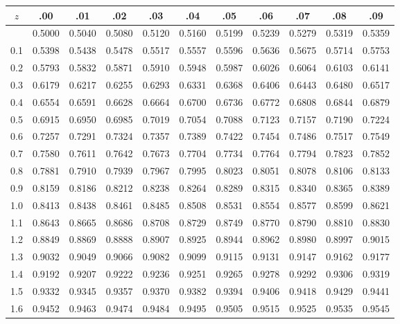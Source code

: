\documentclass[12pt,a4paper]{article}
\begin{document}
\begin{enumerate}
\begin{center}
\small
\begin{longtable}{ccccccccccc}
\toprule\toprule
$z$ & .00 & .01 & .02 & .03 & .04 & .05 & .06 & .07 & .08 & .09 \\
\midrule
\endhead
\bottomrule\bottomrule
\endfoot
0.0 & 0.5000 & 0.5040 & 0.5080 & 0.5120 & 0.5160 & 0.5199 & 0.5239 & 0.5279 & 0.5319 & 0.5359 \\
0.1 & 0.5398 & 0.5438 & 0.5478 & 0.5517 & 0.5557 & 0.5596 & 0.5636 & 0.5675 & 0.5714 & 0.5753 \\
0.2 & 0.5793 & 0.5832 & 0.5871 & 0.5910 & 0.5948 & 0.5987 & 0.6026 & 0.6064 & 0.6103 & 0.6141 \\
0.3 & 0.6179 & 0.6217 & 0.6255 & 0.6293 & 0.6331 & 0.6368 & 0.6406 & 0.6443 & 0.6480 & 0.6517 \\
0.4 & 0.6554 & 0.6591 & 0.6628 & 0.6664 & 0.6700 & 0.6736 & 0.6772 & 0.6808 & 0.6844 & 0.6879 \\
0.5 & 0.6915 & 0.6950 & 0.6985 & 0.7019 & 0.7054 & 0.7088 & 0.7123 & 0.7157 & 0.7190 & 0.7224 \\
0.6 & 0.7257 & 0.7291 & 0.7324 & 0.7357 & 0.7389 & 0.7422 & 0.7454 & 0.7486 & 0.7517 & 0.7549 \\
0.7 & 0.7580 & 0.7611 & 0.7642 & 0.7673 & 0.7704 & 0.7734 & 0.7764 & 0.7794 & 0.7823 & 0.7852 \\
0.8 & 0.7881 & 0.7910 & 0.7939 & 0.7967 & 0.7995 & 0.8023 & 0.8051 & 0.8078 & 0.8106 & 0.8133 \\
0.9 & 0.8159 & 0.8186 & 0.8212 & 0.8238 & 0.8264 & 0.8289 & 0.8315 & 0.8340 & 0.8365 & 0.8389 \\
1.0 & 0.8413 & 0.8438 & 0.8461 & 0.8485 & 0.8508 & 0.8531 & 0.8554 & 0.8577 & 0.8599 & 0.8621 \\
1.1 & 0.8643 & 0.8665 & 0.8686 & 0.8708 & 0.8729 & 0.8749 & 0.8770 & 0.8790 & 0.8810 & 0.8830 \\
1.2 & 0.8849 & 0.8869 & 0.8888 & 0.8907 & 0.8925 & 0.8944 & 0.8962 & 0.8980 & 0.8997 & 0.9015 \\
1.3 & 0.9032 & 0.9049 & 0.9066 & 0.9082 & 0.9099 & 0.9115 & 0.9131 & 0.9147 & 0.9162 & 0.9177 \\
1.4 & 0.9192 & 0.9207 & 0.9222 & 0.9236 & 0.9251 & 0.9265 & 0.9278 & 0.9292 & 0.9306 & 0.9319 \\
1.5 & 0.9332 & 0.9345 & 0.9357 & 0.9370 & 0.9382 & 0.9394 & 0.9406 & 0.9418 & 0.9429 & 0.9441 \\
1.6 & 0.9452 & 0.9463 & 0.9474 & 0.9484 & 0.9495 & 0.9505 & 0.9515 & 0.9525 & 0.9535 & 0.9545 \\

\end{longtable}
\end{center}
\end{enumerate}
\end{document}
